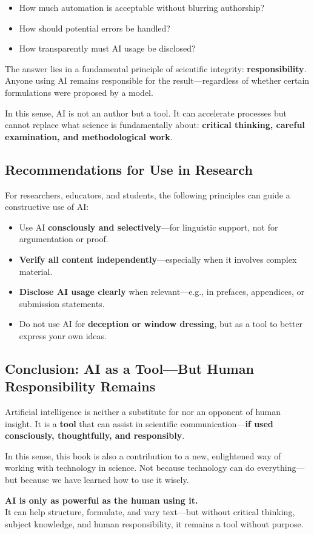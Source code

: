 \begin{itemize}
	\item How much automation is acceptable without blurring authorship?
	\item How should potential errors be handled?
	\item How transparently must AI usage be disclosed?
\end{itemize}

The answer lies in a fundamental principle of scientific integrity: \textbf{responsibility}. Anyone using AI remains responsible for the result—regardless of whether certain formulations were proposed by a model.

In this sense, AI is not an author but a tool. It can accelerate processes but cannot replace what science is fundamentally about: \textbf{critical thinking, careful examination, and methodological work}.

\subsection*{Recommendations for Use in Research}

For researchers, educators, and students, the following principles can guide a constructive use of AI:

\begin{itemize}
	\item Use AI \textbf{consciously and selectively}—for linguistic support, not for argumentation or proof.
	\item \textbf{Verify all content independently}—especially when it involves complex material.
	\item \textbf{Disclose AI usage clearly} when relevant—e.g., in prefaces, appendices, or submission statements.
	\item Do not use AI for \textbf{deception or window dressing}, but as a tool to better express your own ideas.
\end{itemize}

\subsection*{Conclusion: AI as a Tool—But Human Responsibility Remains}

Artificial intelligence is neither a substitute for nor an opponent of human insight. It is a \textbf{tool} that can assist in scientific communication—\textbf{if used consciously, thoughtfully, and responsibly}.

In this sense, this book is also a contribution to a new, enlightened way of working with technology in science. Not because technology can do everything—but because we have learned how to use it wisely.
\vspace{1em}
\begin{tcolorbox}[didaktikbox, title={Guiding Principle}]
	\label{box:guiding_principle}
	\small
	\textbf{AI is only as powerful as the human using it.} \\
	It can help structure, formulate, and vary text—but without critical thinking, subject knowledge, and human responsibility, it remains a tool without purpose.
\end{tcolorbox}
